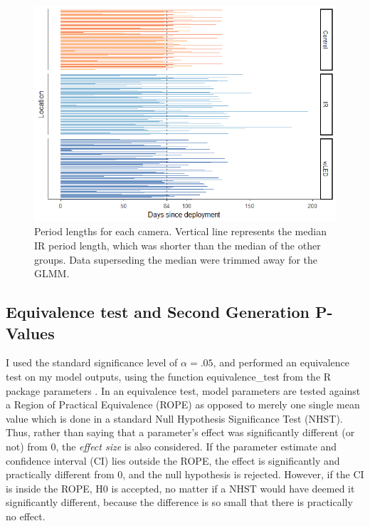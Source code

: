 \begin{figure}
	\centering
	\includegraphics[width=\textwidth]{../R/glmm_sp_files/figure-html/period-length-wControl-1.png}
	\caption[Period lengths]
	{Period lengths for each camera.  \small %
	Vertical line represents the median IR period length, which was shorter than the median of the other groups. Data superseding the median were trimmed away for the GLMM.} 
	\label{fig:median_period}
\end{figure}



\subsection*{Equivalence test and Second Generation P-Values}
I used the standard significance level of $\alpha = .05$, and performed an equivalence test on my model outputs, using the function equivalence\_test from the R package parameters \autocite{R-parameters}.
In an equivalence test, model parameters are tested against a Region of Practical Equivalence (ROPE) as opposed to merely one single mean value which is done in a standard Null Hypothesis Significance Test (NHST).
Thus, rather than saying that a parameter's effect was significantly different (or not) from 0, the \emph{effect size} is also considered.
If the parameter estimate and confidence interval (CI) lies outside the ROPE, the effect is significantly and practically different from 0, and the null hypothesis is rejected.
However, if the CI is inside the ROPE, H0 is accepted, no matter if a NHST would have deemed it significantly different, because the difference is so small that there is practically no effect.

